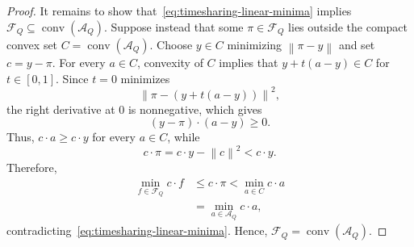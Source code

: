 \documentclass[10pt,a4paper]{amsart}
\newcommand{\norm}[1]{\left\lVert#1\right\rVert}
\begin{document}
\begin{proof}
It remains to show that~\eqref{eq:timesharing-linear-minima} implies
$\mathcal{F}_Q\subseteq\operatorname{conv}(\mathcal{A}_Q)$. Suppose instead
that some $\pi\in\mathcal{F}_Q$ lies outside the compact convex set
$C=\operatorname{conv}(\mathcal{A}_Q)$. Choose $y\in C$ minimizing
$\norm{\pi-y}$ and set $c=y-\pi$. For every $a\in C$, convexity of $C$ implies
that $y+t(a-y)\in C$ for $t\in[0,1]$. Since $t=0$ minimizes
\[
\norm{\pi-(y+t(a-y))}^2,
\]
the right derivative at $0$ is nonnegative, which gives
\[
(y-\pi)\cdot(a-y)\ge0.
\]
Thus, $c\cdot a\ge c\cdot y$ for every $a\in C$, while
\[
c\cdot\pi=c\cdot y-\norm{c}^2<c\cdot y.
\]
Therefore,
\begin{align*}
\min_{f\in\mathcal{F}_Q}c\cdot f
&\le c\cdot\pi
<\min_{a\in C}c\cdot a\\
&=\min_{a\in\mathcal{A}_Q}c\cdot a,
\end{align*}
contradicting~\eqref{eq:timesharing-linear-minima}. Hence,
$\mathcal{F}_Q=\operatorname{conv}(\mathcal{A}_Q)$.
\end{proof}
\end{document}
